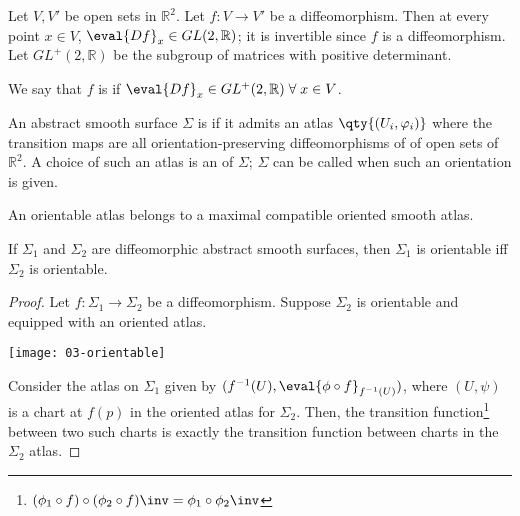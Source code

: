 \begin{definition}
	Let $V, V'$ be open sets in $\mathbb R^2$.
	Let $f \colon V \to V'$ be a diffeomorphism.
	Then at every point $x \in V$, $\eval{Df}_x \in GL(2,\mathbb R)$; it is invertible since $f$ is a diffeomorphism. \\
	Let $GL^+(2,\mathbb R)$ be the subgroup of matrices with positive determinant.

	We say that $f$ is  if $\eval{Df}_x \in GL^+(2, \mathbb{R}) \; \forall \; x \in V$.
\end{definition}

\begin{definition}[Orientable]
	An abstract smooth surface $\Sigma$ is  if it admits an atlas $\qty{(U_i, \varphi_i)}$ where the transition maps are all orientation-preserving diffeomorphisms of of open sets of $\mathbb{R}^2$.
	A choice of such an atlas is an  of $\Sigma$; $\Sigma$ can be called  when such an orientation is given.
\end{definition}

\begin{remark}
	An orientable atlas belongs to a maximal compatible oriented smooth atlas.
\end{remark}

\begin{lemma}
	If $\Sigma_1$ and $\Sigma_2$ are diffeomorphic abstract smooth surfaces, then $\Sigma_1$ is orientable iff $\Sigma_2$ is orientable.
\end{lemma}

\begin{proof}
	Let $f \colon \Sigma_1 \to \Sigma_2$ be a diffeomorphism.
	Suppose $\Sigma_2$ is orientable and equipped with an oriented atlas.

	{\par
    \centering 
    \texttt{[image: 03-orientable]} 
	\par}

	Consider the atlas on $\Sigma_1$ given by $(f^{-1}(U), \eval{\phi \circ f}_{f^{-1}(U)})$, where $(U, \psi)$ is a chart at $f(p)$ in the oriented atlas for $\Sigma_2$.
	Then, the transition function\footnote{$(\phi_1 \circ f) \circ (\phi_2 \circ f)\inv = \phi_1 \circ \phi_2\inv$} between two such charts is exactly the transition function between charts in the $\Sigma_2$ atlas.
\end{proof}

